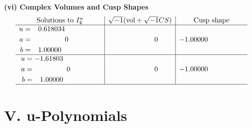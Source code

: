 \documentclass[1p]{elsarticle_modified}
\theoremstyle{definition}
\newcommand{\I}{\sqrt{-1}}
\begin{document}
\newpage\flushleft \textbf{(vi) Complex Volumes and Cusp Shapes}
$$\begin{array}{c|c|c}  
\text{Solutions to }I^u_{4}& \I (\text{vol} + \sqrt{-1}CS) & \text{Cusp shape}\\
 \hline 
\begin{aligned}
u &= \phantom{-}0.618034\phantom{ +0.000000I} \\
a &= \phantom{-0.000000 } 0 \\
b &= \phantom{-}1.00000\phantom{ +0.000000I}\end{aligned}
 & \phantom{-0.000000 } 0 & -1.00000\phantom{ +0.000000I} \\ \hline\begin{aligned}
u &= -1.61803\phantom{ +0.000000I} \\
a &= \phantom{-0.000000 } 0 \\
b &= \phantom{-}1.00000\phantom{ +0.000000I}\end{aligned}
 & \phantom{-0.000000 } 0 & -1.00000\phantom{ +0.000000I}\\
 \hline 
 \end{array}$$\newpage
\newpage\renewcommand{\arraystretch}{1}
\centering \section*{ V. u-Polynomials}
\end{document}
